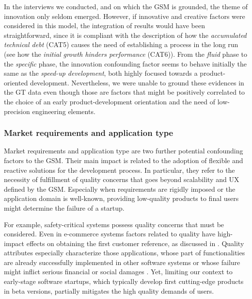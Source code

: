 \documentclass[10pt,journal,letterpaper,compsoc]{IEEEtran}
\begin{document}
In the interviews we conducted, and on which the GSM is grounded, the theme of
innovation only seldom emerged. However, if innovative and creative factors were
considered in this model, the integration of results would have been
straightforward, since it is compliant with the description of how the
\textit{accumulated technical debt} (CAT5) causes the need of establishing a
process in the long run (see how the \textit{initial growth hinders performance}
(CAT6)). %
From  the \textit{fluid} phase to the \textit{specific} phase, the innovation  
confounding factor seems to behave initially the same as the \textit{speed-up  
development}, both highly focused towards a product-oriented development.  
Nevertheless, we were unable to ground these evidences in the GT data even  
though those are factors that might be positively correlated
to the choice of an early product-development orientation and the need of  
low-precision engineering elements.

\subsubsection{Market requirements and application type}  
Market requirements \cite{Coleman2007} and application type \cite{Sutton2000,  
Coleman2008,Coleman2008a} are two further potential confounding factors to the  
GSM. Their main impact is related to the adoption of flexible and reactive  
solutions for the development process. In particular, they refer to the  
necessity of fulfillment of quality concerns that goes beyond scalability and UX 
defined by the GSM. Especially when requirements are rigidly imposed or the  
application domain is well-known, providing low-quality products to final users 
might determine the failure of a startup.

For example, safety-critical systems possess quality concerns that must be
considered. Even in e-commerce systems factors related to quality have  high-
impact effects on obtaining the first customer reference,  
as discussed in \cite{Deakins2005,Kim2005,Silva2005}. Quality attributes
especially %
characterize those applications, whose part of functionalities are already  
successfully implemented in other software systems or whose failure might  
inflict serious financial or social damages \cite{Bass2003}. Yet, limiting our  
context to early-stage software startups, which typically develop first  
cutting-edge products in beta versions, partially mitigates the high quality  
demands of users.
\end{document}
